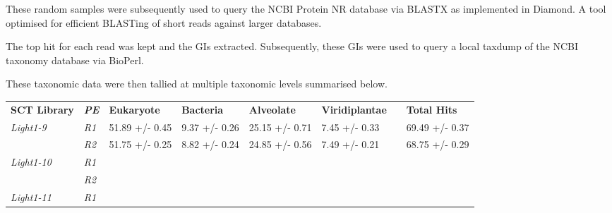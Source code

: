 These random samples were subsequently used to query the NCBI Protein NR database via BLASTX as implemented
in Diamond.  A tool optimised for efficient BLASTing of short reads against larger databases.

The top hit for each read was kept and the GIs extracted.  Subsequently, these GIs were used to query
a local taxdump of the NCBI taxonomy database via BioPerl.

These taxonomic data were then tallied at multiple taxonomic levels summarised below.




\begin{table}[h]
\begin{tabular}{@{}|l|l|llllll@{}}
\toprule
\textbf{SCT Library} & \textit{\textbf{PE}} & \multicolumn{1}{l|}{\textbf{Eukaryote}} & \multicolumn{1}{l|}{\textbf{Bacteria}} & \multicolumn{1}{l|}{\textbf{Alveolate}} & \multicolumn{1}{l|}{\textbf{Viridiplantae}} & \multicolumn{1}{l|}{} & \multicolumn{1}{l|}{\textbf{Total Hits}} \\ \cmidrule(r){1-6} \cmidrule(l){8-8} 
\textit{Light1-9}    & \textit{R1}          & \multicolumn{1}{l|}{51.89 +/- 0.45}     & \multicolumn{1}{l|}{9.37 +/- 0.26}     & \multicolumn{1}{l|}{25.15 +/-  0.71}    & \multicolumn{1}{l|}{7.45 +/- 0.33}          & \multicolumn{1}{l|}{} & 69.49 +/- 0.37                           \\ \cmidrule(lr){2-2}
                     & \textit{R2}          & 51.75 +/- 0.25                          & 8.82 +/- 0.24                          & 24.85 +/- 0.56                          & 7.49 +/- 0.21                               &                       & 68.75 +/- 0.29                           \\ \cmidrule(r){1-2}
\textit{Light1-10}   & \textit{R1}          &                                         &                                        &                                         & \multicolumn{1}{l|}{}                       & \multicolumn{1}{l|}{} &                                          \\ \cmidrule(lr){2-2}
                     & \textit{R2}          &                                         &                                        &                                         &                                             &                       &                                          \\ \cmidrule(r){1-2}
\textit{Light1-11}   & \textit{R1}          &                                         &                                        &                                         & \multicolumn{1}{l|}{}                       & \multicolumn{1}{l|}{} &                                          \\ \cmidrule(lr){2-2}

\end{tabular}
\end{table}
